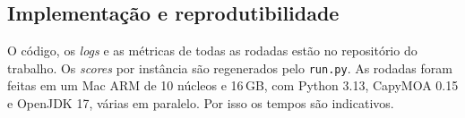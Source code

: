 \subsection{Implementação e reprodutibilidade}
O código, os \emph{logs} e as métricas de todas as rodadas estão no repositório do trabalho. Os
\emph{scores} por instância são regenerados pelo \texttt{run.py}. As rodadas foram feitas em um Mac
ARM de 10 núcleos e 16\,GB, com Python 3.13, CapyMOA 0.15 e OpenJDK 17, várias em paralelo. Por isso
os tempos são indicativos.
